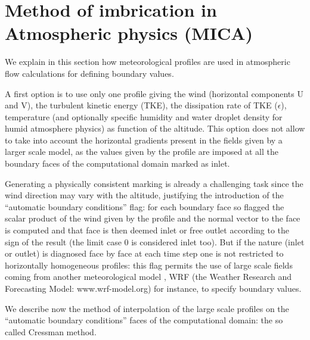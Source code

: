 \section{ Method of imbrication in \CS Atmospheric physics (MICA)}
We explain in this section how meteorological profiles are used in
atmospheric flow calculations for defining boundary values.

A first option is to use only one profile giving the wind (horizontal components U and V),
the turbulent kinetic energy (TKE), the dissipation rate of TKE ($\epsilon$),
temperature (and optionally specific humidity and water droplet density for
humid atmosphere physics) as function of the altitude. This option does not allow to take into account the horizontal gradients present in the
fields given by a larger scale model, as the values given by the
profile are imposed at all the boundary faces of the computational domain
marked as inlet.

Generating a physically consistent marking is already a
challenging task since the wind direction may vary with the altitude,
justifying the introduction of the ``automatic boundary conditions'' flag:
for each boundary face so flagged the scalar product of the wind given by
the profile and the normal vector to the face is computed and that face is
then deemed inlet or free outlet according to the sign of the result (the
limit case 0 is considered inlet too). But if the nature (inlet or outlet)
is diagnosed face by face at each time step one is not restricted to
horizontally homogeneous profiles: this flag permits the use of large scale
fields coming from another meteorological model , WRF (the Weather
Research and Forecasting Model: www.wrf-model.org) for
instance, to specify boundary values.

We describe now the method of interpolation of the large scale profiles on the ``automatic boundary
conditions'' faces of the computational domain: the so called Cressman
method.

